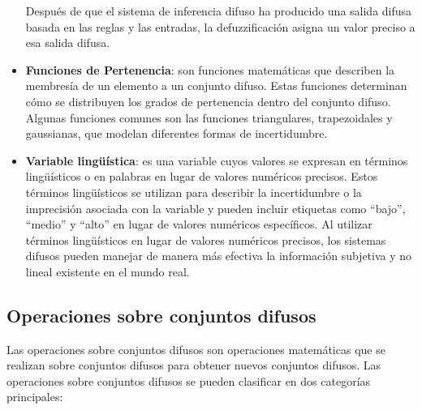 \documentclass[
  a4paper,
  DIV=11,
  numbers=noendperiod]{scrreprt}
\begin{document}
\begin{itemize}
  Después de que el sistema de inferencia difuso ha producido una salida
  difusa basada en las reglas y las entradas, la defuzzificación asigna
  un valor preciso a esa salida difusa.
\item
  \textbf{Funciones de Pertenencia}: son funciones matemáticas que
  describen la membresía de un elemento a un conjunto difuso. Estas
  funciones determinan cómo se distribuyen los grados de pertenencia
  dentro del conjunto difuso. Algunas funciones comunes son las
  funciones triangulares, trapezoidales y gaussianas, que modelan
  diferentes formas de incertidumbre.
\item
  \textbf{Variable lingüística}: es una variable cuyos valores se
  expresan en términos lingüísticos o en palabras en lugar de valores
  numéricos precisos. Estos términos lingüísticos se utilizan para
  describir la incertidumbre o la imprecisión asociada con la variable y
  pueden incluir etiquetas como ``bajo'', ``medio'' y ``alto'' en lugar
  de valores numéricos específicos. Al utilizar términos lingüísticos en
  lugar de valores numéricos precisos, los sistemas difusos pueden
  manejar de manera más efectiva la información subjetiva y no lineal
  existente en el mundo real.
\end{itemize}

\subsection{Operaciones sobre conjuntos
difusos}\label{operaciones-sobre-conjuntos-difusos}

Las operaciones sobre conjuntos difusos son operaciones matemáticas que
se realizan sobre conjuntos difusos para obtener nuevos conjuntos
difusos. Las operaciones sobre conjuntos difusos se pueden clasificar en
dos categorías principales:
\end{document}
